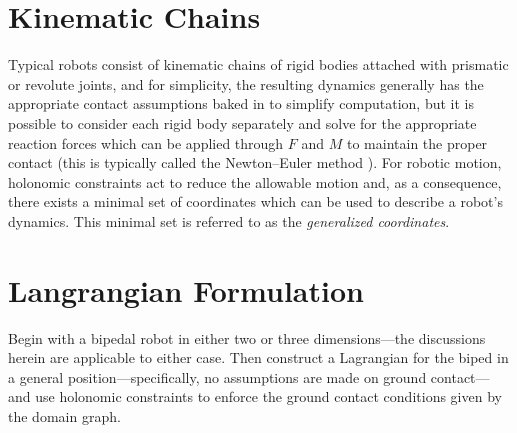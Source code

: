 \section{Kinematic Chains}

Typical robots consist of kinematic chains of rigid bodies attached with prismatic or revolute joints, and for simplicity, the resulting dynamics generally has the appropriate contact assumptions baked in to simplify computation, but it is possible to consider each rigid body separately and solve for the appropriate reaction forces which can be applied through $F$ and $M$ to maintain the proper contact (this is typically called the Newton--Euler method \cite{Hollerbach80}).
%
For robotic motion, holonomic constraints act to reduce the allowable motion and, as a consequence, there exists a minimal set of coordinates which can be used to describe a robot's dynamics.
%
This minimal set is referred to as the {\em generalized coordinates}.


\section{Langrangian Formulation}

%
%


Begin with a bipedal robot in either two or three dimensions---the discussions herein are applicable to either case.
%
Then construct a Lagrangian for the biped in a general position---specifically, no assumptions are made on ground contact---and use holonomic constraints to enforce the ground contact conditions given by the domain graph.

